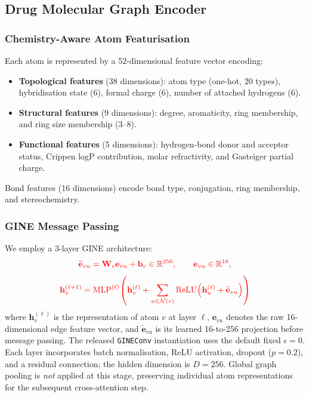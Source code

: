 \documentclass[fleqn,10pt]{wlscirep}
\begin{document}
\subsection{Drug Molecular Graph Encoder}

\subsubsection{Chemistry-Aware Atom Featurisation}

Each atom is represented by a 52-dimensional feature vector encoding:
\begin{itemize}[leftmargin=*]
\item \textbf{Topological features} (38 dimensions): atom type (one-hot,
  20 types), hybridisation state (6), formal charge (6), number of
  attached hydrogens (6).
\item \textbf{Structural features} (9 dimensions): degree, aromaticity, ring
  membership, and ring size membership (3--8).
\item \textbf{Functional features} (5 dimensions): hydrogen-bond donor and
  acceptor status, Crippen logP contribution, molar refractivity, and Gasteiger
  partial charge.
\end{itemize}
Bond features (16 dimensions) encode bond type, conjugation, ring membership,
and stereochemistry.

\subsubsection{GINE Message Passing}

We employ a 3-layer GINE
architecture:\cite{hu2020strategies}
\begin{equation}
\begingroup\color{red}
\widetilde{\mathbf{e}}_{vu}=\mathbf{W}_e\mathbf{e}_{vu}+\mathbf{b}_e
\in\mathbb{R}^{256},\qquad \mathbf{e}_{vu}\in\mathbb{R}^{16},
\label{eq:edge_projection}
\endgroup
\end{equation}
\begin{equation}
\begingroup\color{red}
\mathbf{h}_v^{(\ell+1)} = \mathrm{MLP}^{(\ell)}\!\left(
  \mathbf{h}_v^{(\ell)} +
  \sum_{u\in\mathcal{N}(v)}
  \mathrm{ReLU}\!\left(\mathbf{h}_u^{(\ell)} + \widetilde{\mathbf{e}}_{vu}\right)
\right)
\endgroup
\end{equation}
where $\mathbf{h}_v^{(\ell)}$ is the representation of atom $v$ at layer $\ell$,
\begingroup\color{red}$\mathbf{e}_{vu}$ denotes the raw 16-dimensional edge
feature vector, and $\widetilde{\mathbf{e}}_{vu}$ is its learned 16-to-256
projection before message passing. The released \texttt{GINEConv} instantiation
uses the default fixed $\epsilon=0$.\endgroup{} Each layer incorporates batch normalisation, ReLU activation,
dropout ($p=0.2$), and a residual connection; the hidden dimension is $D=256$.
Global graph pooling is \emph{not} applied at this stage, preserving individual
atom representations for the subsequent cross-attention step.
\end{document}
